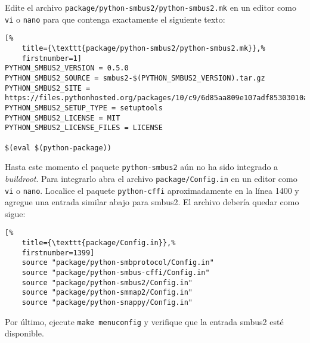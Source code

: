 Edite el archivo \texttt{package/python-smbus2/python-smbus2.mk} en un editor como \texttt{vi} o \texttt{nano} para que contenga exactamente el siguiente texto:

\begin{lstlisting}[%
	title={\texttt{package/python-smbus2/python-smbus2.mk}},%
	firstnumber=1]
PYTHON_SMBUS2_VERSION = 0.5.0
PYTHON_SMBUS2_SOURCE = smbus2-$(PYTHON_SMBUS2_VERSION).tar.gz
PYTHON_SMBUS2_SITE = https://files.pythonhosted.org/packages/10/c9/6d85aa809e107adf85303010a59b340be109c8f815cbedc5c08c73bcffef
PYTHON_SMBUS2_SETUP_TYPE = setuptools
PYTHON_SMBUS2_LICENSE = MIT
PYTHON_SMBUS2_LICENSE_FILES = LICENSE

$(eval $(python-package))
\end{lstlisting}

Hasta este momento el paquete \texttt{python-smbus2} aún no ha sido integrado a \emph{buildroot}.
Para integrarlo abra el archivo \texttt{package/Config.in} en un editor como \texttt{vi} o \texttt{nano}.
Localice el paquete \texttt{python-cffi} aproximadamente en la línea 1400 y agregue una entrada similar abajo para smbus2.
El archivo debería quedar como sigue:

\begin{lstlisting}[%
	title={\texttt{package/Config.in}},%
	firstnumber=1399]
	source "package/python-smbprotocol/Config.in"
	source "package/python-smbus-cffi/Config.in"
	source "package/python-smbus2/Config.in"
	source "package/python-smmap2/Config.in"
	source "package/python-snappy/Config.in"
\end{lstlisting}

Por último, ejecute \texttt{make menuconfig} y verifique que la entrada smbus2 esté disponible.
